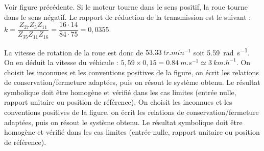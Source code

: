 \begin{corrigebox}
Voir figure précédente. Si le moteur tourne dans le sens positif, la roue tourne dans le sens négatif.
Le rapport de réduction de la transmission est le suivant : 
$k=\dfrac{Z_{27} Z_{5} Z_{11} }{Z_{35} Z_{11} Z_{16}} = \dfrac{16\cdot 14}{84\cdot 75} =0,0355 $.

La vitesse de rotation de la roue est donc de $\SI{53,33}{tr.min^{-1}}$ soit \SI{5,59}{rad.s^{-1}}. 
On en déduit la vitesse du véhicule : $5,59 \times 0,15 = \SI{0,84}{m.s^{-1}}\simeq \SI{3}{km.h^{-1}}$.
On choisit les inconnues et les conventions positives de la figure,
        on écrit les relations de conservation/fermeture adaptées, puis on résout le
        système obtenu. Le résultat symbolique doit être homogène et vérifié dans les cas
        limites (entrée nulle, rapport unitaire ou position de référence).
On choisit les inconnues et les conventions positives de la figure,
        on écrit les relations de conservation/fermeture adaptées, puis on résout le
        système obtenu. Le résultat symbolique doit être homogène et vérifié dans les cas
        limites (entrée nulle, rapport unitaire ou position de référence).
\end{corrigebox}
